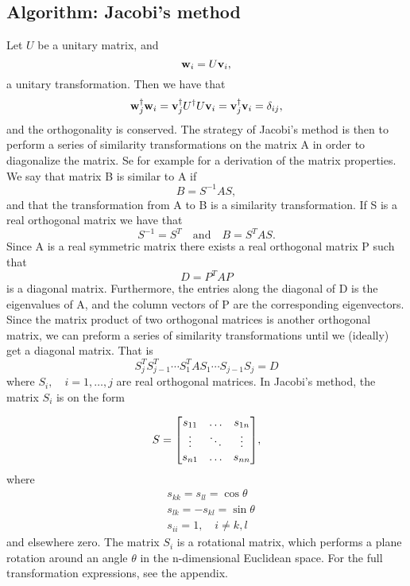 \subsection{Algorithm: Jacobi's method}
\label{sec:jacobi}
Let $U$ be a unitary matrix, and
  \[\vb{w}_i = U\vb{v}_i,
  \]
a unitary transformation. Then we have that
  \[\vb{w}_j^\dagger \vb{w}_i = \vb{v}_j^\dagger U^\dagger U \vb{v}_i = \vb{v}_j^\dagger \vb{v}_i = \delta_{ij},\]
and the orthogonality is conserved.
The strategy of Jacobi's method is then to perform a series of similarity transformations on the matrix A in order to diagonalize the matrix. Se for example \cite{linalg} for a derivation of the matrix properties. We say that matrix B is similar to A if
 \begin{equation}
	B = S^{-1}AS,
 \end{equation}
and that the transformation from A to B is a similarity transformation. If S is a real orthogonal matrix we have that
 \begin{equation}\label{eq:sim}
	 S^{-1}=S^T \quad \text{and} \quad B = S^TAS.
 \end{equation}
Since A is a real symmetric matrix there exists a real orthogonal matrix P such that
 \begin{equation}
     D=P^TAP
 \end{equation}
is a diagonal matrix. Furthermore, the entries along the diagonal of D is the eigenvalues of A, and the column vectors of P are the corresponding eigenvectors. Since the matrix product of two orthogonal matrices is another orthogonal matrix, we can preform a series of similarity transformations until we (ideally) get a diagonal matrix. That is
\begin{equation}
S_j^TS_{j-1}^T\cdots S_1^TAS_1 \cdots S_{j-1}S_j = D
\end{equation}
where $S_i, \quad i = 1, \ldots, j $ are real orthogonal matrices. In Jacobi's method, the matrix $S_i$ is on the form

\begin{equation}\label{eq:S}
S =
\mqty[s_{11} & \hdots & s_{1n} \\
\vdots & \ddots & \vdots \\
s_{n1} & \hdots & s_{nn} ],
\end{equation}
where
\begin{equation}
\begin{split}
&s_{kk}=s_{ll} = \cos \theta \\
&s_{lk} = -s_{kl} = \sin \theta \\
&s_{ii} =  1, \quad i \neq k,l
\end{split}
\end{equation}
and elsewhere zero. The matrix $S_i$ is a rotational matrix, which performs a plane rotation around an angle $\theta$ in the n-dimensional Euclidean space. For the full transformation expressions, see the appendix.

